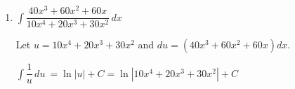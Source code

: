 \documentclass{article}
\begin{document}
\begin{enumerate}
\begin{solution}
    $\displaystyle \int \dfrac{2x+3}{x^2+1}\,dx\ = \displaystyle \int \dfrac{2x}{x^2+1}\,dx\ + \displaystyle \int \dfrac{3}{x^2+1}\,dx\ = \displaystyle 2\int \dfrac{x}{x^2+1}\,dx\ + \displaystyle 3\int \dfrac{1}{x^2+1}\,dx\ $. Using our work in \#2ai and \#2aii from the first page of Workshop 9, 

    $\displaystyle 2\int \dfrac{x}{x^2+1}\,dx\ + \displaystyle 3\int \dfrac{1}{x^2+1}\,dx\ = 2\cdot \dfrac{1}{2}\ln(1+x^2) + 3\arctan x+C = \ln(1+x^2) + 3\arctan x+C$. 
\end{solution}
\pspace{\vfill}
\item $\displaystyle \int \dfrac{40x^3+60x^2+60x}{10x^4+20x^3+30x^2}\,dx\ $

\begin{solution}
    Let $u=10x^4+20x^3+30x^2$ and $du=(40x^3+60x^2+60x)dx$.

$\displaystyle \int \dfrac{1}{u}\,du\ = \ln|u|+C=\ln|10x^4+20x^3+30x^2|+C$
    
\end{solution}
\pspace{\vfill}

\end{enumerate}
\end{document}
